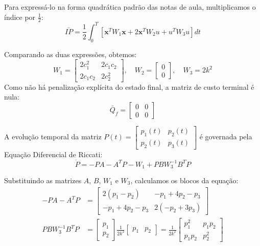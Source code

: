 \documentclass[a4paper, 12pt]{article}%
\begin{document}
Para expressá-lo na forma quadrática padrão das notas de aula, multiplicamos o índice por $\frac{1}{2}$:
\begin{equation}
\bar{IP} = \frac{1}{2} \int_0^T \left[ \mathbf{x}^T W_1 \mathbf{x} + 2\mathbf{x}^T W_2 u + u^T W_3 u \right] dt
\end{equation}

Comparando as duas expressões, obtemos:
\begin{equation}
W_1 = \begin{bmatrix} 2c_1^2 & 2c_1c_2 \\ 2c_1c_2 & 2c_2^2 \end{bmatrix}, \quad W_2 = \begin{bmatrix} 0 \\ 0 \end{bmatrix}, \quad W_3 = 2k^2
\end{equation}
Como não há penalização explícita do estado final, a matriz de custo terminal é nula:
\begin{equation}
\bar{Q}_f = \begin{bmatrix} 0 & 0 \\ 0 & 0 \end{bmatrix}
\end{equation}


A evolução temporal da matriz $P(t) = \begin{bmatrix} p_1(t) & p_2(t) \\ p_2(t) & p_3(t) \end{bmatrix}$ é governada pela Equação Diferencial de Riccati:
\begin{equation}
\dot{P} = -PA - A^TP - W_1 + P B W_3^{-1} B^T P
\end{equation}

Substituindo as matrizes $A$, $B$, $W_1$ e $W_3$, calculamos os blocos da equação:
\begin{align*}
-PA - A^TP &= \begin{bmatrix} 2(p_1 - p_2) & -p_1 + 4p_2 - p_3 \\ -p_1 + 4p_2 - p_3 & 2(-p_2 + 3p_3) \end{bmatrix} \\
P B W_3^{-1} B^T P &= \begin{bmatrix} p_1 \\ p_2 \end{bmatrix} \frac{1}{2k^2} \begin{bmatrix} p_1 & p_2 \end{bmatrix} = \frac{1}{2k^2} \begin{bmatrix} p_1^2 & p_1p_2 \\ p_1p_2 & p_2^2 \end{bmatrix}
\end{align*}
\end{document}
